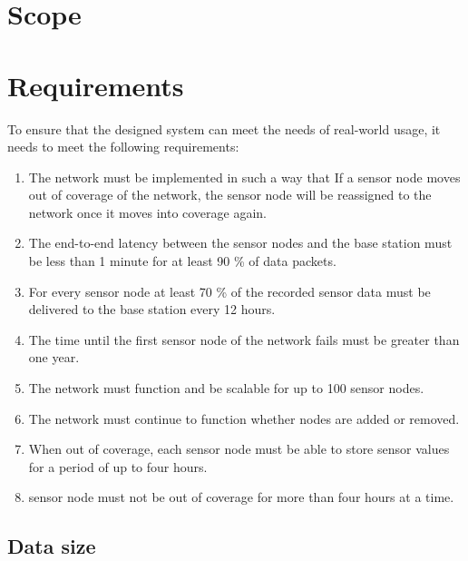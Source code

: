 \documentclass[conference]{IEEEtran}
\begin{document}
\section{Scope}


\section{Requirements}

To ensure that the designed system can meet the needs of real-world usage, it
needs to meet the following requirements:

\begin{enumerate} 

    \item The network must be implemented in such a way that If a sensor node
        moves out of coverage of the network, the sensor node will be
        reassigned to the network once it moves into coverage again.  
        
    \item The end-to-end latency between the sensor nodes and the base station
        must be less than 1 minute for at least 90 \% of data packets.
        
    \item For every sensor node at least 70 \% of the recorded sensor data must
        be delivered to the base station every 12 hours.
        
    \item The time until the first sensor node of the network fails must be
        greater than one year.  
        
    \item The network must function and be scalable for up to 100 sensor nodes.
        
    \item The network must continue to function whether nodes are added or
        removed.
    
    \item When out of coverage, each sensor node must be able to store sensor
        values for a period of up to four hours.
    
    \item  sensor node must not be out of coverage for more than four hours at
        a time.

\end{enumerate}


\subsection{Data size}
\end{document}
